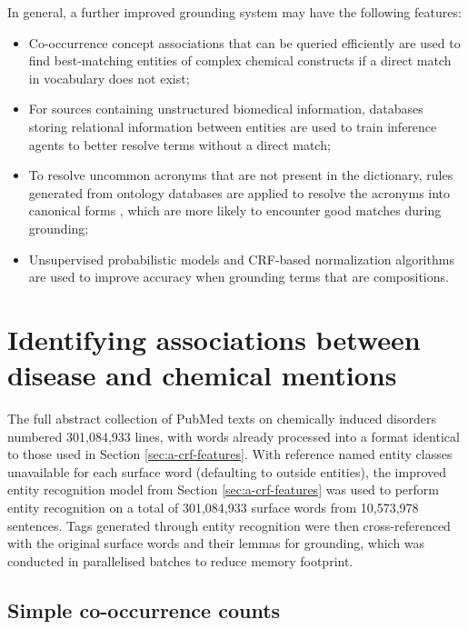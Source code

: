 \documentclass[10pt, oneside]{article}
\begin{document}
In general, a further improved grounding system may have the following features:
\begin{itemize}
	\item Co-occurrence concept associations that can be queried efficiently \cite{tsuruoka2008facta} are used to find best-matching entities of complex chemical constructs if a direct match in vocabulary does not exist;
	\item For sources containing unstructured biomedical information, databases storing relational information \cite{kim2005biocontrasts} between entities are used to train inference agents \cite{shin2015incremental} to better resolve terms without a direct match;
	\item To resolve uncommon acronyms that are not present in the dictionary, rules generated from ontology databases are applied to resolve the acronyms into canonical forms \cite{naderi2011organismtagger}, which are more likely to encounter good matches during grounding;
	\item Unsupervised probabilistic models \cite{pecina2010lexical} and CRF-based normalization algorithms \cite{lee2016audis} are used to improve accuracy when grounding terms that are compositions.
\end{itemize}

\section{Identifying associations between disease and chemical mentions}

The full abstract collection of PubMed texts on chemically induced disorders numbered 301,084,933 lines, with words already processed into a format identical to those used in Section \ref{sec:a-crf-features}. With reference named entity classes unavailable for each surface word (defaulting to outside entities), the improved entity recognition model from Section \ref{sec:a-crf-features} was used to perform entity recognition on a total of 301,084,933 surface words from 10,573,978 sentences. Tags generated through entity recognition were then cross-referenced with the original surface words and their lemmas for grounding, which was conducted in parallelised batches to reduce memory footprint. 

\subsection{Simple co-occurrence counts} \label{subsec:simple-co}
\end{document}
